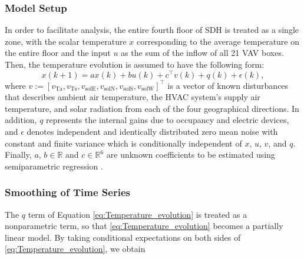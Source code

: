 \subsubsection{Model Setup}
In order to facilitate analysis, the entire fourth floor of SDH is treated as a single zone, with the scalar temperature $x$ corresponding to the %
average temperature on the entire floor and the input $u$ as the sum of the inflow of all 21 VAV boxes. %
Then, the temperature evolution is assumed to have the following form:
\begin{equation}\label{eq:Temperature_evolution}
x(k+1) = a x(k) + b u(k) + c^\top v(k) + q(k) + \epsilon(k),
\end{equation}
where %
$v := \left[v_\text{Ta}, v_\text{Ts}, v_\text{solE}, v_\text{solN}, v_\text{solS}, v_\text{solW} \right]^\top$ is a vector of known disturbances that describes ambient air temperature, the HVAC system's supply air temperature, and solar radiation from each of the four geographical directions.
In addition, $q$ represents the internal gains due to occupancy and electric devices, and $\epsilon$ denotes independent and identically distributed zero mean noise with constant and finite variance which is conditionally independent of $x$, $u$, $v$, and $q$. Finally, $a$, $b \in \mathbb{R}$ and $c \in \mathbb{R}^6$ are unknown coefficients to be estimated using semiparametric regression \cite{Ruppert:2003aa, Hardle:2000aa}.

\subsubsection{Smoothing of Time Series}
The $q$ term of Equation \eqref{eq:Temperature_evolution} is treated as a nonparametric term, so that \eqref{eq:Temperature_evolution} becomes a partially linear model. By taking conditional expectations on both sides of \eqref{eq:Temperature_evolution}, we obtain

